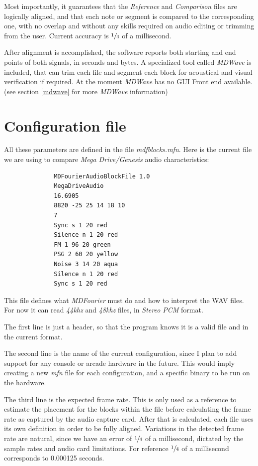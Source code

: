 \documentclass[10pt,a4paper]{report}
\begin{document}
Most importantly, it guarantees that the \textit{Reference} and \textit{Comparison} files are logically aligned, and that each note or segment is compared to the corresponding one, with no overlap and without any skills required on audio editing or trimming from the user. Current accuracy is $\sfrac{1}{4}$ of a millisecond.

After alignment is accomplished, the software reports both starting and end points of both signals, in seconds and bytes. A specialized tool called \textit{MDWave} is included, that can trim each file and segment each block for acoustical and visual verification if required. At the moment \textit{MDWave} has no GUI Front end available. (see section \ref{mdwave} for more \textit{MDWave} information) 

\section{Configuration file}
\label{mfnconfig}

All these parameters are defined in the file \textit{mdfblocks.mfn}. Here is the current file we are using to compare \textit{Mega Drive/Genesis} audio characteristics:

\begin{verbatim}
              MDFourierAudioBlockFile 1.0
              MegaDriveAudio
              16.6905
              8820 -25 25 14 18 10
              7
              Sync s 1 20 red
              Silence n 1 20 red
              FM 1 96 20 green
              PSG 2 60 20 yellow
              Noise 3 14 20 aqua
              Silence n 1 20 red
              Sync s 1 20 red
\end{verbatim}

This file defines what \textit{MDFourier} must do and how to interpret the WAV files. For now it can read \textit{44khz} and \textit{48khz} files, in \textit{Stereo PCM} format.

The first line is just a header, so that the program knows it is a valid file and in the current format.

The second line is the name of the current configuration, since I plan to add support for any console or arcade hardware in the future. This would imply creating a new \textit{mfn} file for each configuration, and a specific binary to be run on the hardware.

The third line is the expected frame rate. This is only used as a reference to estimate the placement for the blocks within the file before calculating the frame rate as captured by the audio capture card. After that is calculated, each file uses its own definition in order to be fully aligned. Variations in the detected frame rate are natural, since we have an error of $\sfrac{1}{4}$ of a millisecond, dictated by the sample rates and audio card limitations. For reference $\sfrac{1}{4}$ of a millisecond corresponds to 0.000125 seconds.
\end{document}
